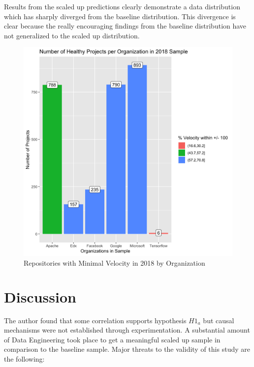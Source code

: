 \documentclass{article}
\begin{document}
Results from the scaled up predictions clearly demonstrate a data
distribution which has sharply diverged from the baseline distribution.
This divergence is clear because the really encouraging findings from
the baseline distribution have not generalized to the scaled up distribution.


\begin{figure}[h]
  \centering
  \includegraphics[scale=0.1]{f2}
  \caption{Repositories with Minimal Velocity in 2018 by Organization}
  \label{fig:desc_scale}
  \end{figure}


\section{Discussion}

The author found that some correlation supports hypothesis $H1_a$ but
causal mechanisms were not established through experimentation. A substantial
amount of Data Engineering took place to get a meaningful scaled up sample
in comparison to the baseline sample. Major threats to the validity of this
study are the following:
\end{document}
